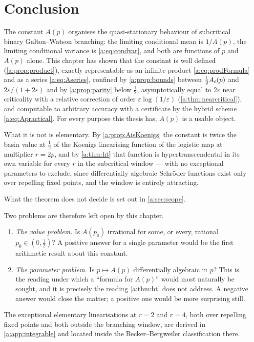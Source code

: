 \section{Conclusion}
\label{a:sec:conclusion}

The constant $A(p)$ organises the quasi-stationary behaviour of subcritical binary
Galton--Watson branching: the limiting conditional mean is $1/A(p)$, the limiting
conditional variance is \cref{a:eq:condvar}, and both are functions of $p$ and
$A(p)$ alone. This chapter has shown that the constant is well defined
(\cref{a:prop:product}), exactly representable as an infinite product
\cref{a:eq:prodFormula} and as a series \cref{a:eq:Aseries}, confined by
\cref{a:prop:bounds} between $\tfrac12A_{\mathrm{c}}(p)$ and $2\varepsilon/(1+2\varepsilon)$
and by \cref{a:prop:parity} below $\tfrac12$, asymptotically equal to $2\varepsilon$
near criticality with a relative correction of order $\varepsilon\log(1/\varepsilon)$
(\cref{a:thm:nearcritical}), and computable to arbitrary accuracy with a
certificate by the hybrid scheme \cref{a:eq:Apractical}. For every purpose this
thesis has, $A(p)$ is a usable object.

What it is not is elementary. By \cref{a:prop:AisKoenigs} the constant is twice
the basin value at
$\tfrac12$ of the Koenigs linearising function of the logistic map at multiplier
$r=2p$, and by \cref{a:thm:ht} that function is hypertranscendental in its own
variable for every $r$ in the subcritical window --- with no exceptional parameters
to exclude, since differentially algebraic Schröder functions exist only over
repelling fixed points, and the window is entirely attracting.

What the theorem does not decide is set out in \cref{a:sec:scope}.

Two problems are therefore left open by this chapter.

\begin{enumerate}[leftmargin=*]
\item \emph{The value problem.} Is $A(p_0)$ irrational for some, or every, rational
      $p_0\in(0,\tfrac12)$? A positive answer for a single parameter would be the
      first arithmetic result about this constant.
\item \emph{The parameter problem.} Is $p\mapsto A(p)$ differentially algebraic in
      $p$? This is the reading under which a ``formula for $A(p)$'' would most
      naturally be sought, and it is precisely the reading \cref{a:thm:ht} does not
      address. A negative answer would close the matter; a positive one would be
      more surprising still.
\end{enumerate}

The exceptional elementary linearisations at $r=2$ and $r=4$, both over repelling
fixed points and both outside the branching window, are derived in
\cref{a:app:integrable} and located inside the Becker--Bergweiler classification
there.
